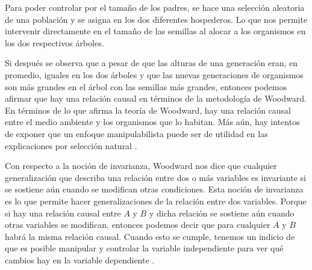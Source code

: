  \begin{center}
 \end{center}


 Para poder controlar por el tamaño de los padres, se hace una selección aleatoria de una población y se asigna en los dos diferentes hospederos. Lo que nos permite intervenir directamente en el tamaño de las semillas al alocar a los organismos en los dos respectivos árboles.

 \begin{center}
 \end{center}

Si después se observa que a pesar de que las alturas de una generación eran, en promedio, iguales en los dos árboles y que las nuevas generaciones de organismos son más grandes en el árbol con las semillas más grandes, entonces podemos afirmar que hay una relación causal en términos de la metodología de Woodward. En términos de lo que afirma la teoría de Woodward, hay una relación causal entre el medio ambiente y los organismos que lo habitan. Más aún, hay intentos de exponer que un enfoque manipulabilista puede ser de utilidad en las explicaciones por selección natural \cite{MacColl2011}.

Con respecto a la noción de invarianza, Woodward nos dice que cualquier generalización que describa una relación entre dos o más variables es invariante si se sostiene aún cuando se modifican otras condiciones. Esta noción de invarianza es lo que permite hacer generalizaciones de la relación entre dos variables. Porque si hay una relación causal entre $A$ y $B$ y dicha relación se sostiene aún cuando otras variables se modifican, entonces podemos decir que para cualquier $A$ y $B$ habrá la misma relación causal. Cuando esto se cumple, tenemos un indicio de que es posible manipular y controlar la variable independiente para ver qué cambios hay en la variable dependiente \cite{Woodward2000}.

